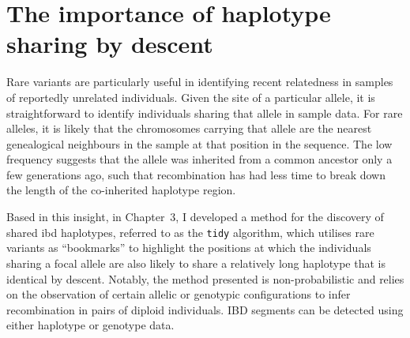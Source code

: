 


%
\section{The importance of haplotype sharing by descent}
%

Rare variants are particularly useful in identifying recent relatedness in samples of reportedly unrelated individuals.
Given the site of a particular allele, it is straightforward to identify individuals sharing that allele in sample data. For rare alleles, it is likely that the chromosomes carrying that allele are the nearest genealogical neighbours in the sample at that position in the sequence.
The low frequency suggests that the allele was inherited from a common ancestor only a few generations ago, such that recombination has had less time to break down the length of the co-inherited haplotype region.

Based in this insight, in Chapter~3, I developed a method for the discovery of shared \gls{ibd} haplotypes, referred to as the \texttt{tidy} algorithm, which utilises rare variants as ``bookmarks'' to highlight the positions at which the individuals sharing a focal allele are also likely to share a relatively long haplotype that is identical by descent.
Notably, the method presented is non-probabilistic and relies on the observation of certain allelic or genotypic configurations to infer recombination in pairs of diploid individuals.
IBD segments can be detected using either haplotype or genotype data.

